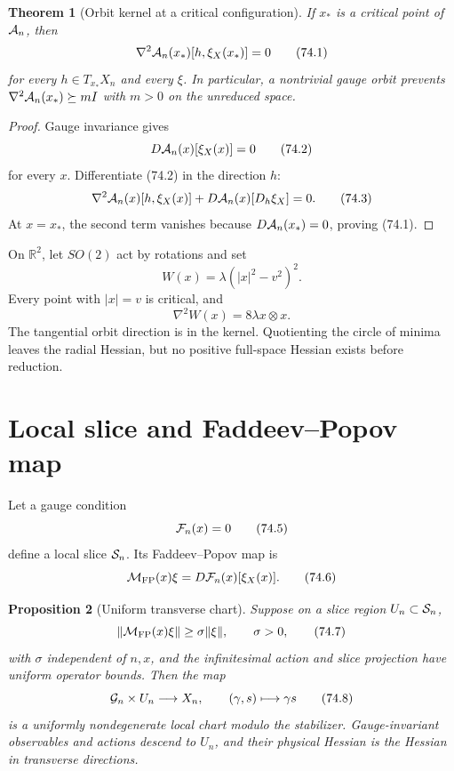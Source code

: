 \documentclass[11pt]{article}
\newtheorem{theorem}{Theorem}[section]
\newtheorem{proposition}[theorem]{Proposition}
\theoremstyle{remark}
\begin{document}
\begin{theorem}[Orbit kernel at a critical configuration]
\label{thm:v15v74-orbit-kernel}
If \(x_*\) is a critical point of \({\cal A}_n\), then
\[
 \nabla^2{\cal A}_n(x_*)[h,\xi_X(x_*)]=0              \tag{74.1}
\]
for every \(h\in T_{x_*}X_n\) and every \(\xi\).  In particular, a
nontrivial gauge orbit prevents
\(\nabla^2{\cal A}_n(x_*)\succeq mI\) with \(m>0\) on the
unreduced space.
\end{theorem}

\begin{proof}
Gauge invariance gives
\[
 D{\cal A}_n(x)[\xi_X(x)]=0                            \tag{74.2}
\]
for every \(x\).  Differentiate (74.2) in the direction \(h\):
\[
 \nabla^2{\cal A}_n(x)[h,\xi_X(x)]
 +D{\cal A}_n(x)[D_h\xi_X]=0.                         \tag{74.3}
\]
At \(x=x_*\), the second term vanishes because
\(D{\cal A}_n(x_*)=0\), proving (74.1).
\end{proof}

\begin{counterexample}
\label{cnt:v15v74-circle}
On \({\mathbb R}^2\), let \(SO(2)\) act by rotations and set
\[
 W(x)=\lambda(|x|^2-v^2)^2.
\]
Every point with \(|x|=v\) is critical, and
\[
 \nabla^2W(x)=8\lambda x\otimes x.                    \tag{74.4}
\]
The tangential orbit direction is in the kernel.  Quotienting the
circle of minima leaves the radial Hessian, but no positive
full-space Hessian exists before reduction.
\end{counterexample}

\section{Local slice and Faddeev--Popov map}

Let a gauge condition
\[
 {\cal F}_n(x)=0                                      \tag{74.5}
\]
define a local slice \({\cal S}_n\).  Its Faddeev--Popov map is
\[
 {\cal M}_{\rm FP}(x)\xi
 =
 D{\cal F}_n(x)[\xi_X(x)].                             \tag{74.6}
\]

\begin{proposition}[Uniform transverse chart]
\label{prop:v15v74-slice}
Suppose on a slice region \(U_n\subset{\cal S}_n\),
\[
 \|{\cal M}_{\rm FP}(x)\xi\|
 \geq\sigma\|\xi\|,\qquad\sigma>0,                    \tag{74.7}
\]
with \(\sigma\) independent of \(n,x\), and the infinitesimal action
and slice projection have uniform operator bounds.  Then the map
\[
 {\cal G}_n\times U_n\longrightarrow X_n,\qquad
 (\gamma,s)\longmapsto\gamma s                        \tag{74.8}
\]
is a uniformly nondegenerate local chart modulo the stabilizer.
Gauge-invariant observables and actions descend to \(U_n\), and
their physical Hessian is the Hessian in transverse directions.
\end{proposition}
\end{document}
